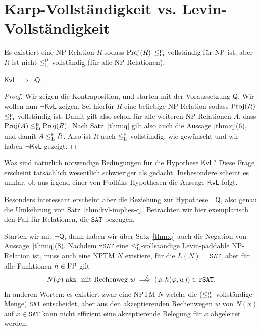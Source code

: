 \section{Karp-Vollständigkeit vs. Levin-Vollständigkeit}

\begin{conjecture}\label{conj:kvl}
    Es existiert eine NP-Relation $R$ sodass $\operatorname{Proj}(R)$ $\leq_\mathrm{m}^\mathrm{p}$-vollständig für $\mathrm{NP}$ ist, aber $R$ ist nicht $\leq_\mathrm{L}^\mathrm{p}$-vollständig (für alle NP-Relationen).
\end{conjecture}

\begin{theorem}\label{thm:kvl-implies-q}
    $\mathsf{KvL} \implies \neg\mathsf{Q}$.
\end{theorem}
\begin{proof}
    Wir zeigen die Kontraposition, und starten mit der Voraussetzung $\mathsf{Q}$.
    Wir wollen nun $\neg\mathsf{KvL}$ zeigen. Sei hierfür $R$ eine beliebige NP-Relation sodass $\operatorname{Proj}(R)$ $\leq_\mathrm{m}^\mathrm{p}$-vollständig ist.
    Damit gilt also schon für alle weiteren NP-Relationen $A$, dass $\operatorname{Proj}(A)\leq_\mathrm{m}^\mathrm{p}\operatorname{Proj}(R)$.
    Nach Satz~\ref{thm:q} gilt also auch die Aussage \ref{thm:q}(6), und damit $A\leq_\mathrm{L}^\mathrm{p} R$. Also ist $R$ auch $\leq_\mathrm{L}^\mathrm{p}$-vollständig, wie gewünscht und wir haben $\neg\mathsf{KvL}$ gezeigt.
\end{proof}

Was sind natürlich notwendige Bedingungen für die Hypothese $\mathsf{KvL}$? Diese Frage erscheint tatsächlich wesentlich schwieriger als gedacht. Insbesondere scheint es unklar, ob aus irgend einer von Pudláks Hypothesen die Aussage $\mathsf{KvL}$ folgt.

Besonders interessant erscheint aber die Beziehung zur Hypothese $\neg\mathsf{Q}$, also genau die Umkehrung von Satz~\ref{thm:kvl-implies-q}.
Betrachten wir hier exemplarisch den Fall für Relationen, die $\mathtt{SAT}$ bezeugen.

Starten wir mit $\neg\mathsf{Q}$, dann haben wir über Satz~\ref{thm:q} auch die Negation von Aussage~\ref{thm:q}(8). Nachdem $\mathtt{rSAT}$ eine $\leq_\mathrm{L}^\mathrm{p}$-vollständige Levin-paddable NP-Relation ist, muss auch eine NPTM $N$ existiere, für die $L(N)=\mathtt{SAT}$, aber für alle Funktionen $h\in\mathrm{FP}$ gilt
\begin{equation} N(\phi) \text{ akz. mit Rechenweg $w$} \rlap{\hspace*{2pt}\raisebox{2.3pt}{$\quad\not$}}\implies  (\phi, h(\phi, w))\in\mathtt{rSAT}.\label{eq:weak-irreducibility} \end{equation}
In anderen Worten: es existiert zwar eine NPTM $N$ welche die ($\leq_\mathrm{m}^\mathrm{p}$-vollständige Menge) $\mathtt{SAT}$ entscheidet, aber aus den akzeptierenden Rechenwegen $w$ von $N(x)$ auf $x\in \mathtt{SAT}$ kann nicht effizient eine akzeptierende Belegung für $x$ abgeleitet werden.

